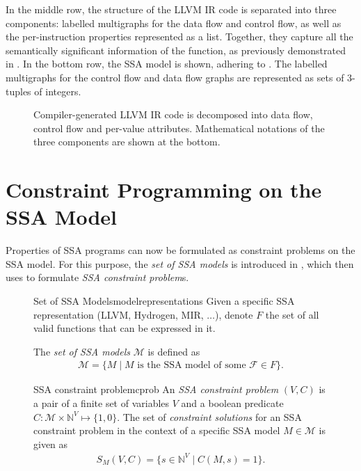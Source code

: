     In the middle row, the structure of the LLVM IR code is separated into three
    components: labelled multigraphs for the data flow and control flow, as well
    as the per-instruction properties represented as a list.
    Together, they capture all the semantically significant information of the
    function, as previously demonstrated in .
    In the bottom row, the SSA model is shown, adhering to .
    The labelled multigraphs for the control flow and data flow graphs are
    represented as sets of $3$-tuples of integers.

\begin{figure}[p]

\caption{Compiler-generated LLVM IR code is decomposed into data flow, control
         flow and per-value attributes.
         Mathematical notations of the three components are shown at the
         bottom.}
\label{fig:derivemaths}
\end{figure}

\section{Constraint Programming on the SSA Model}
\label{sec:constraintprogramming}

    Properties of SSA programs can now be formulated as constraint problems on
    the SSA model.
    For this purpose, the {\it set of SSA models} is introduced in
    , which  then uses to
    formulate {\em SSA constraint problem}s.

\begin{figure}[H]
\begin{definition}{Set of SSA Models}{modelrepresentations}
    Given a specific SSA representation (LLVM, Hydrogen, MIR, $\dots$),
    denote $F$ the set of all valid functions that can be expressed in it.

    The {\em set of SSA models} $\mathcal M$ is defined as
    \begin{align*}
        \mathcal M=\{M\mid M \text{ is the SSA model of some }\mathcal F\in F\}.
    \end{align*}
\end{definition}

\begin{definition}{SSA constraint problem}{cprob}
    An {\it SSA constraint problem} $(V,C)$ is a pair of a finite set of
    variables $V$ and a boolean predicate
    $C\colon\mathcal M\times\mathbb N^V\mapsto\{1,0\}$.
    The set of {\em constraint solutions} for an SSA constraint problem in the
    context of a specific SSA model $M\in\mathcal M$ is given as
    \begin{align*}
        S_M(V,C) = \{s\in\mathbb N^V\mid C(M,s)=1\}.
    \end{align*}
\end{definition}
\end{figure}

